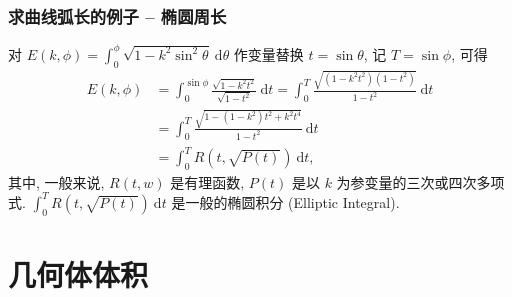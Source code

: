 
\begin{frame}
\frametitle{求曲线弧长的例子 -- 椭圆周长}

对 $E(k, \phi) = \int_0^\phi \sqrt{1 - k^2 \sin^2 \theta} ~ \mathrm{d}\theta$ 作变量替换 $t = \sin \theta$, 记 $T = \sin \phi$, 可得
\begin{align*}
E(k, \phi) & = \int_0^{\sin \phi} \frac{\sqrt{1 - k^2 t^2}}{\sqrt{1 - t^2}} ~ \mathrm{d}t = \int_0^{T} \frac{\sqrt{(1 - k^2t^2) (1 - t^2)}}{1 - t^2} ~ \mathrm{d}t \\
& = \int_0^{T} \frac{\sqrt{1 - (1 - k^2) t^2 + k^2 t^4}}{1 - t^2} ~ \mathrm{d}t \\
& = \int_0^{T} R(t, \sqrt{P(t)}) ~ \mathrm{d}t,
\end{align*}
其中, 一般来说, $R(t, w)$ 是有理函数, $P(t)$ 是以 $k$ 为参变量的三次或四次多项式. $\int_0^{T} R(t, \sqrt{P(t)}) ~ \mathrm{d}t$ 是一般的\alert{椭圆积分 (Elliptic Integral)}.

\end{frame}


\section{几何体体积}


